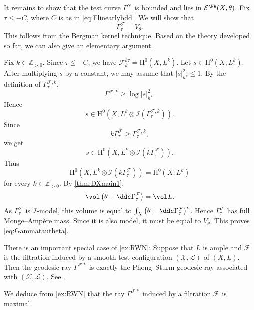 \begin{example}
    It remains to show that the test curve $\Gamma^{\mathcal{F}}$ is bounded and lies in $\mathcal{E}^{\NA}(X,\theta)$. Fix $\tau\leq -C$, where $C$ is as in \eqref{eq:Flinearlybdd}. We will show that
    \begin{equation}\label{eq:Gammatautheta}
    \Gamma^{\mathcal{F}}_{\tau}=V_{\theta}.
    \end{equation}
    This follows from the Bergman kernel technique. Based on the theory developed so far, we can also give an elementary argument.

    Fix $k\in\mathbb Z_{>0}$. Since $\tau\leq -C$, we have $\mathcal F^{k\tau}_k=\mathrm H^0(X,L^k)$. Let $s\in\mathrm H^0(X,L^k)$. After multiplying $s$ by a constant, we may assume that $|s|_{h^k}^2\leq1$. By the definition of $\Gamma^{\mathcal F,k}_\tau$,
    \[
        \Gamma^{\mathcal F,k}_\tau\geq \log|s|_{h^k}^2.
    \]
    Hence
    \[
        s\in \mathrm H^0\left(X,L^k\otimes\mathcal I(\Gamma^{\mathcal F,k}_\tau)\right).
    \]
    Since
    \[
    k\Gamma^{\mathcal F}_\tau \geq \Gamma^{\mathcal F,k}_\tau,
    \]
    we get
    \[
        s\in \mathrm H^0\left(X,L^k\otimes\mathcal I(k\Gamma^{\mathcal F}_\tau)\right).
    \]
    Thus
    \[
        \mathrm H^0\left(X,L^k\otimes\mathcal I(k\Gamma^{\mathcal F}_\tau)\right)=\mathrm H^0(X,L^k)
    \]
    for every $k\in\mathbb Z_{>0}$. By \cref{thm:DXmain1},
    \[
        \vol\left(\theta+\ddc\Gamma^{\mathcal F}_\tau\right)=\vol L.
    \]
    As $\Gamma^{\mathcal F}_\tau$ is $\mathcal I$-model, this volume is equal to $\int_X\left(\theta+\ddc \Gamma^{\mathcal F}_\tau\right)^n$. Hence $\Gamma^{\mathcal F}_\tau$ has full Monge--Amp\`ere mass. Since it is also model, it must be equal to $V_\theta$. This proves \eqref{eq:Gammatautheta}.
\end{example}

\begin{remark}\label{rmk:PhongSturm}
    There is an important special case of \cref{ex:RWN}: Suppose that $L$ is ample and $\mathcal{F}$ is the filtration induced by a smooth test configuration $(\mathcal{X},\mathcal{L})$ of $(X,L)$. Then the geodesic ray $\Gamma^{\mathcal{F}*}$ is exactly the Phong--Sturm geodesic ray associated with $(\mathcal{X},\mathcal{L})$. See \cite[Section~9]{RWN14}.
\end{remark}

\begin{remark}\label{rmk:max_filt}
    We deduce from \cref{ex:RWN} that the ray $\Gamma^{\mathcal{F}*}$ induced by a filtration $\mathcal{F}$ is maximal.
\end{remark}

